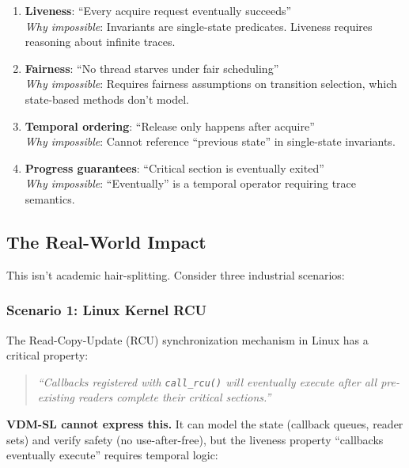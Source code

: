 \documentclass[11pt]{article}
\begin{document}
\begin{enumerate}[leftmargin=*]
\item \textbf{Liveness}: ``Every acquire request eventually succeeds''\\
\textit{Why impossible}: Invariants are single-state predicates. Liveness requires reasoning about infinite traces.

\item \textbf{Fairness}: ``No thread starves under fair scheduling''\\
\textit{Why impossible}: Requires fairness assumptions on transition selection, which state-based methods don't model.

\item \textbf{Temporal ordering}: ``Release only happens after acquire''\\
\textit{Why impossible}: Cannot reference ``previous state'' in single-state invariants.

\item \textbf{Progress guarantees}: ``Critical section is eventually exited''\\
\textit{Why impossible}: ``Eventually'' is a temporal operator requiring trace semantics.
\end{enumerate}

\subsection{The Real-World Impact}

This isn't academic hair-splitting. Consider three industrial scenarios:

\subsubsection{Scenario 1: Linux Kernel RCU}

The Read-Copy-Update (RCU) synchronization mechanism in Linux has a critical property:

\begin{quote}
\textit{``Callbacks registered with \texttt{call\_rcu()} will eventually execute after all pre-existing readers complete their critical sections.''}
\end{quote}

\textbf{VDM-SL cannot express this.} It can model the state (callback queues, reader sets) and verify safety (no use-after-free), but the liveness property ``callbacks eventually execute'' requires temporal logic:
\end{document}
